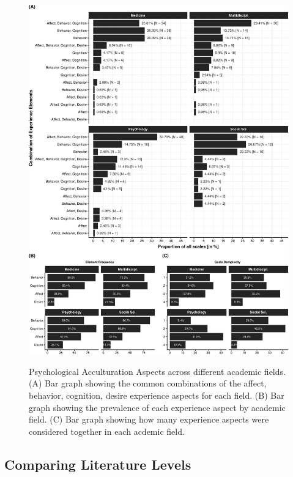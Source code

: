 \documentclass[man, 12pt, a4paper, mask]{apa7}
\begin{document}
\begin{figure}[h]
\centering
\caption{Psychological Acculturation Aspects across different academic fields. (A) Bar graph showing the common combinations of the affect, behavior, cognition, desire experience aspects for each field. (B) Bar graph showing the prevalence of each experience aspect by academic field. (C) Bar graph showing how many experience aspects were considered together in each acdemic field.}
\includegraphics[width=\textwidth]{Figures/FieldPlotFreq-1}
\label{fig:FieldPlotFreq}
\end{figure}

\subsection{Comparing Literature Levels}
\end{document}
